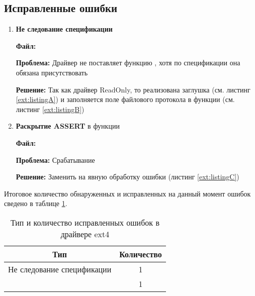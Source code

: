 \subsection{Исправленные ошибки}
\begin{enumerate}
	\item \textbf{Не следование спецификации}
	
	\textbf{Файл:} 
	
	\textbf{Проблема:} Драйвер не поставляет функцию , хотя по спецификации она обязана присутствовать \cite{UEFISpec}
	
	\textbf{Решение:} Так как драйвер ReadOnly, то реализована заглушка   (см. листинг \ref{ext:listingA}) и заполняется поле  файлового протокола в функции  (см. листинг \ref{ext:listingB})
	 
	 
	
	\item \textbf{Раскрытие ASSERT} в функции 
	
	\textbf{Файл:} 
	
	\textbf{Проблема:} Срабатывание 
	
	\textbf{Решение:} Заменить  на явную обработку ошибки (листинг \ref{ext:listingC})
	  
\end{enumerate}

Итоговое количество обнаруженных и исправленных на данный момент ошибок сведено в таблице \ref{ext:tab:sumerror}.
\begin{table}[htbp]
	\renewcommand{\arraystretch}{1.5}
	\centering
	\begin{tabular}{|c|c|}
		\hline
		\textbf{Тип} & \textbf{Количество} \\
		\hline
		Не следование спецификации & 1 \\
		\hline
		\ErrorName{Assert} & 1 \\
		\hline
	\end{tabular}
	\caption{Тип и количество исправленных ошибок в драйвере ext4}
	\label{ext:tab:sumerror}
\end{table}

